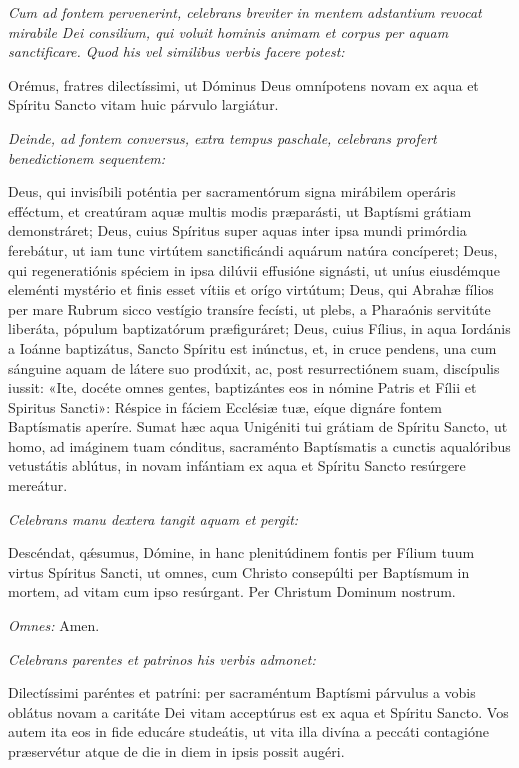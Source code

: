 \textit{Cum ad fontem pervenerint, celebrans breviter in mentem 
adstantium revocat mirabile Dei consilium,
qui voluit hominis animam et corpus per aquam sanctificare.
Quod his vel similibus verbis facere potest:}

Orémus, fratres dilectíssimi, ut Dóminus Deus omnípotens novam ex aqua et
Spíritu Sancto vitam huic párvulo largiátur.

\textit{Deinde, ad fontem conversus, extra tempus paschale, celebrans
profert benedictionem sequentem:}

Deus,
qui invisíbili poténtia
per sacramentórum signa mirábilem operáris efféctum,
et creatúram aquæ multis modis præparásti,
ut Baptísmi grátiam demonstráret;
Deus, cuius Spíritus
super aquas inter ipsa mundi primórdia ferebátur,
ut iam tunc virtútem sanctificándi aquárum natúra concíperet;
Deus, qui regeneratiónis spéciem
in ipsa dilúvii effusióne signásti,
ut uníus eiusdémque eleménti mystério
et finis esset vítiis et orígo virtútum;
Deus, qui Abrahæ fílios
per mare Rubrum sicco vestígio transíre fecísti,
ut plebs, a Pharaónis servitúte liberáta,
pópulum baptizatórum præfiguráret;
Deus, cuius Fílius, in aqua Iordánis a Ioánne baptizátus,
Sancto Spíritu est inúnctus,
et, in cruce pendens,
una cum sánguine aquam de látere suo prodúxit,
ac, post resurrectiónem suam, discípulis iussit:
«Ite, docéte omnes gentes,
baptizántes eos in nómine Patris et Fílii et Spiritus Sancti»:
Réspice in fáciem Ecclésiæ tuæ,
eíque dignáre fontem Baptísmatis aperíre.
Sumat hæc aqua Unigéniti tui grátiam de Spíritu Sancto,
ut homo, ad imáginem tuam cónditus,
sacraménto Baptísmatis
a cunctis aqualóribus vetustátis ablútus,
in novam infántiam
ex aqua et Spíritu Sancto resúrgere mereátur.

\textit{Celebrans manu dextera tangit aquam et pergit:}

Descéndat, qǽsumus, Dómine,
in hanc plenitúdinem fontis
per Fílium tuum virtus Spíritus Sancti,
ut omnes, cum Christo consepúlti
per Baptísmum in mortem,
ad vitam cum ipso resúrgant.
Per Christum Dominum nostrum.

\textit{Omnes:} Amen.


\textit{Celebrans parentes et patrinos his verbis admonet:}

Dilectíssimi paréntes et patríni: per sacraméntum Baptísmi párvulus a vobis
oblátus novam a caritáte Dei vitam acceptúrus est ex aqua et Spíritu Sancto. 
Vos autem ita eos in fide educáre studeátis, ut vita illa divína a peccáti
contagióne præservétur atque de die in diem in ipsis possit augéri.

